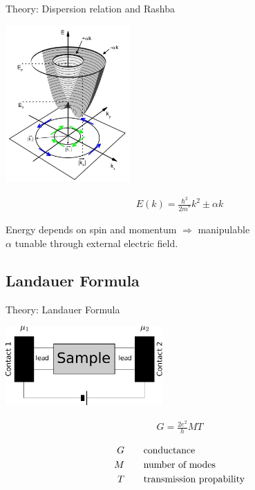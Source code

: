 \documentclass{beamer}
\begin{document}
\begin{frame}{Theory: Dispersion relation and Rashba}

    \begin{multicols}{2}
        \includegraphics[height=6cm]{rashba-dispersion.jpg}

        \begin{align*}
            E(k) = \frac{\hbar^2}{2 m^*} k^2 \pm \alpha k
        \end{align*}

        Energy depends on spin and momentum $\Rightarrow$ manipulable\\[1em]

        $\alpha$ tunable through external electric field.
\end{multicols}
\end{frame}

\subsection{Landauer Formula}

\begin{frame}{Theory: Landauer Formula}
    \begin{multicols}{2}
        \includegraphics[width=6cm]{sample-leads}

        \begin{align*}
            G = \frac{2 e^2}{h} MT
        \end{align*}

        \begin{align*}
            G \qquad& \textnormal{conductance}\\
            M \qquad& \textnormal{number of modes}\\
            T \qquad& \textnormal{transmission propability}
        \end{align*}
    \end{multicols}
\end{frame}
\end{document}

